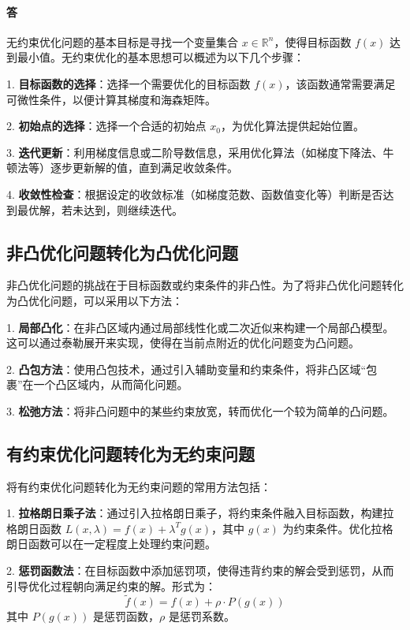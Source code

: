 \documentclass[a4paper]{article}
\begin{document}
\paragraph{答}

无约束优化问题的基本目标是寻找一个变量集合 $x \in \mathbb{R}^n$，使得目标函数 $f(x)$ 达到最小值。无约束优化的基本思想可以概述为以下几个步骤：

1. \textbf{目标函数的选择}：选择一个需要优化的目标函数 $f(x)$，该函数通常需要满足可微性条件，以便计算其梯度和海森矩阵。

2. \textbf{初始点的选择}：选择一个合适的初始点 $x_0$，为优化算法提供起始位置。

3. \textbf{迭代更新}：利用梯度信息或二阶导数信息，采用优化算法（如梯度下降法、牛顿法等）逐步更新解的值，直到满足收敛条件。

4. \textbf{收敛性检查}：根据设定的收敛标准（如梯度范数、函数值变化等）判断是否达到最优解，若未达到，则继续迭代。

\subsection{非凸优化问题转化为凸优化问题}

非凸优化问题的挑战在于目标函数或约束条件的非凸性。为了将非凸优化问题转化为凸优化问题，可以采用以下方法：

1. \textbf{局部凸化}：在非凸区域内通过局部线性化或二次近似来构建一个局部凸模型。这可以通过泰勒展开来实现，使得在当前点附近的优化问题变为凸问题。

2. \textbf{凸包方法}：使用凸包技术，通过引入辅助变量和约束条件，将非凸区域“包裹”在一个凸区域内，从而简化问题。

3. \textbf{松弛方法}：将非凸问题中的某些约束放宽，转而优化一个较为简单的凸问题。

\subsection{有约束优化问题转化为无约束问题}

将有约束优化问题转化为无约束问题的常用方法包括：

1. \textbf{拉格朗日乘子法}：通过引入拉格朗日乘子，将约束条件融入目标函数，构建拉格朗日函数 $L(x, \lambda) = f(x) + \lambda^T g(x)$，其中 $g(x)$ 为约束条件。优化拉格朗日函数可以在一定程度上处理约束问题。

2. \textbf{惩罚函数法}：在目标函数中添加惩罚项，使得违背约束的解会受到惩罚，从而引导优化过程朝向满足约束的解。形式为：
   \[
   \tilde{f}(x) = f(x) + \rho \cdot P(g(x))
   \]
   其中 $P(g(x))$ 是惩罚函数，$\rho$ 是惩罚系数。
\end{document}
